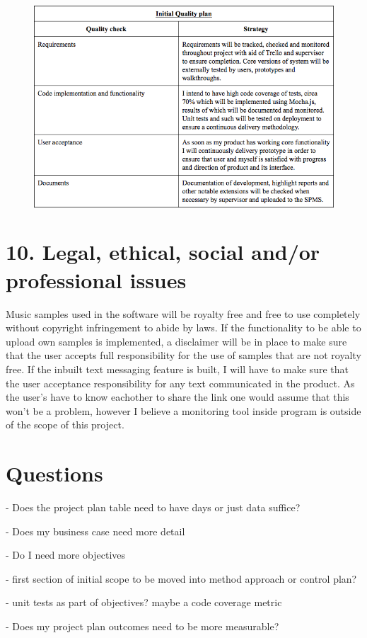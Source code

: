 \documentclass[a4paper]{article}
\begin{document}
\begin{figure}

    \includegraphics[width=\linewidth]{img/initial-quality-table.png}

\end{figure}

\section{10. Legal, ethical, social and/or professional issues}

Music samples used in the software will be royalty free and free to use completely without copyright infringement to abide by laws. If the functionality to be able to upload own samples is implemented, a disclaimer will be in place to make sure that the user accepts full responsibility for the use of samples that are not royalty free. If the inbuilt text messaging feature is built, I will have to make sure that the user acceptance responsibility for any text communicated in the product. As the user's have to know eachother to share the link one would assume that this won't be a problem, however I believe a monitoring tool inside program is outside of the scope of this project.

\section{Questions}

- Does the project plan table need to have days or just data suffice? \par
- Does my business case need more detail \par
- Do I need more objectives \par
- first section of initial scope to be moved into method approach or control plan? \par
- unit tests as part of objectives? maybe a code coverage metric \par
- Does my project plan outcomes need to be more measurable? \par
\end{document}
